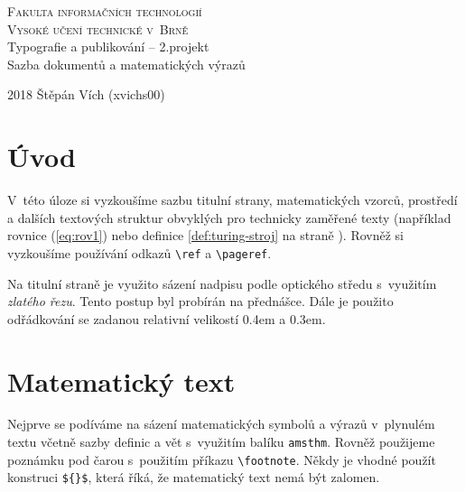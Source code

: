 \documentclass[twocolumn, a4paper, titlepage, 11pt]{article}
\begin{document}
\theoremstyle{definition}
\newtheorem{definition}{Definice}
\theoremstyle{plain}
\newtheorem{sentence}{Věta}

\begin{titlepage}

\begin{center}
\Huge
\textsc{Fakulta informačních technologií \\ Vysoké učení technické v~Brně}\\
Typografie a publikování -- 2.projekt\\
Sazba dokumentů a matematických výrazů
\end{center}

{\LARGE 2018 \hfill
Štěpán Vích (xvichs00)}

\end{titlepage}

\section*{Úvod}

V~této úloze si vyzkoušíme sazbu titulní strany, matematických vzorců, prostředí a dalších textových struktur obvyklých pro technicky zaměřené texty (například rovnice (\ref{eq:rov1}) nebo definice \ref{def:turing-stroj}
 na straně \pageref{def:turing-stroj}). Rovněž si vyzkoušíme používání odkazů \verb|\ref| a \verb|\pageref|.

Na titulní straně je využito sázení nadpisu podle optického středu 
s~využitím \emph{zlatého řezu}. Tento po\-stup byl probírán na přednášce. Dále je použito odřádkování se zadanou relativní velikostí 0.4em a 0.3em.


\section{Matematický text}

Nejprve se podíváme na sázení matematických symbolů a výrazů v~plynulém textu včetně sazby definic a vět s~využitím balíku \verb|amsthm|. Rovněž použijeme poznámku pod čarou s~použitím příkazu \verb|\footnote|. Někdy je vhodné použít konstruci \verb|${}$|, která říká, že matematický text nemá být zalomen.
\end{document}
